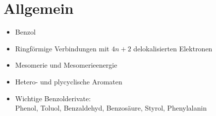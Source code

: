 \section{Allgemein}
\begin{itemize}
    \item Benzol
    \item Ringförmige Verbindungen mit $4n+2$ delokalisierten Elektronen
    \item Mesomerie und Mesomerieenergie
    \item Hetero- und plycyclische Aromaten
    \item Wichtige Benzolderivate: \\
        Phenol, Toluol, Benzaldehyd, Benzosäure, Styrol, Phenylalanin
\end{itemize}
